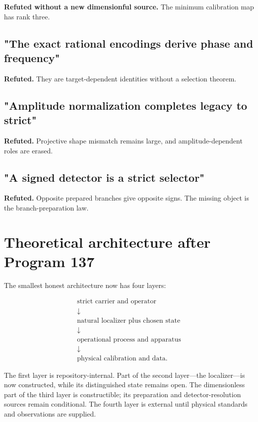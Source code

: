 \documentclass[11pt,a4paper,openany]{report}
\begin{document}
\textbf{Refuted without a new dimensionful source.} The minimum calibration map has rank three.

\subsection{"The exact rational encodings derive phase and frequency"}

\textbf{Refuted.} They are target-dependent identities without a selection theorem.

\subsection{"Amplitude normalization completes legacy to strict"}

\textbf{Refuted.} Projective shape mismatch remains large, and amplitude-dependent roles are erased.

\subsection{"A signed detector is a strict selector"}

\textbf{Refuted.} Opposite prepared branches give opposite signs. The missing object is the branch-preparation law.

\section{Theoretical architecture after Program 137}

The smallest honest architecture now has four layers:

\[
\begin{gathered}
\boxed{\text{strict carrier and operator}}
\\ \downarrow \\
\boxed{\text{natural localizer plus chosen state}}
\\ \downarrow \\
\boxed{\text{operational process and apparatus}}
\\ \downarrow \\
\boxed{\text{physical calibration and data}}.
\end{gathered}
\]

The first layer is repository-internal. Part of the second layer---the localizer---is now constructed, while its distinguished state remains open. The dimensionless part of the third layer is constructible; its preparation and detector-resolution sources remain conditional. The fourth layer is external until physical standards and observations are supplied.
\end{document}

